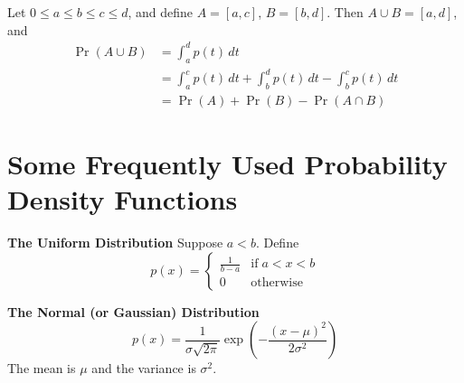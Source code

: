 Let $0 \le a \le b \le c \le d$,
and define $A = [a,c]$, $B = [b,d]$.
Then $A \cup B = [a,d]$, and
\begin{equation}
\begin{split}
  \Pr(A\cup B) & = \int_a^d p(t)\,dt \\
     & = \int_a^c p(t)\,dt
           + \int_b^d p(t)\,dt
           - \int_b^c p(t)\,dt \\
     & = \Pr(A) + \Pr(B) - \Pr(A\cap B)
\end{split}
\end{equation}
%
%
\section{Some Frequently Used Probability 
Density Functions}
\medskip
\noindent
\textbf{The Uniform Distribution}
Suppose $a < b$.
Define
\begin{equation}
   p(x) = \begin{cases}
            \frac{1}{b-a} & \textrm{if}\; a < x < b \\
	    0             & \textrm{otherwise}
          \end{cases}
\end{equation}

\medskip
\noindent
\textbf{The Normal (or Gaussian) Distribution}
\begin{equation}
  p(x) = \frac{1}{\sigma \sqrt{2\pi}}
           \exp\left(-\frac{(x-\mu)^2}{2\sigma^2}\right)
\end{equation}
The mean is $\mu$ and the variance is $\sigma^2$.

